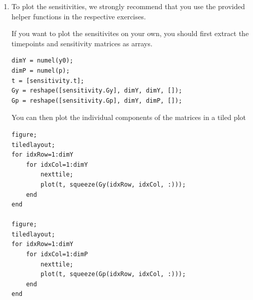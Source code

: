 \begin{enumerate}
	\item To plot the sensitivities, we strongly recommend that you use the provided helper functions in the respective exercises.

	If you want to plot the sensitivites on your own, you should first extract the timepoints and sensitivity matrices as arrays.
	\begin{lstlisting}
dimY = numel(y0);
dimP = numel(p);
t = [sensitivity.t];
Gy = reshape([sensitivity.Gy], dimY, dimY, []);
Gp = reshape([sensitivity.Gp], dimY, dimP, []);
	\end{lstlisting}
	You can then plot the individual components of the matrices in a tiled plot
	\begin{lstlisting}
figure;
tiledlayout;
for idxRow=1:dimY
    for idxCol=1:dimY
        nexttile;
        plot(t, squeeze(Gy(idxRow, idxCol, :)));
    end
end

figure;
tiledlayout;
for idxRow=1:dimY
    for idxCol=1:dimP
        nexttile;
        plot(t, squeeze(Gp(idxRow, idxCol, :)));
    end
end
	\end{lstlisting}
\end{enumerate}
\newpage

